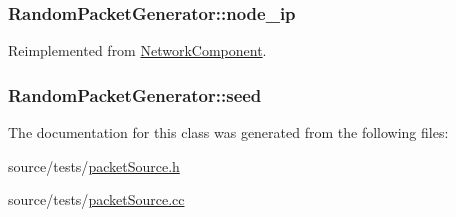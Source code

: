 \hypertarget{classRandomPacketGenerator_072334e770d2a5a5ee77c7a859fad16b}{
\subsubsection[{node\_\-ip}]{ {\bf RandomPacketGenerator::node\_\-ip}}}
\label{classRandomPacketGenerator_072334e770d2a5a5ee77c7a859fad16b}




Reimplemented from \hyperlink{classNetworkComponent_56599b3484333fb78af1b6c33f77cf16}{NetworkComponent}.\hypertarget{classRandomPacketGenerator_d4e9934b7709eea404fb5df509a07e21}{
\subsubsection[{seed}]{ {\bf RandomPacketGenerator::seed}}}
\label{classRandomPacketGenerator_d4e9934b7709eea404fb5df509a07e21}




The documentation for this class was generated from the following files:\begin{CompactItemize}
\item 
source/tests/\hyperlink{packetSource_8h}{packetSource.h}\item 
source/tests/\hyperlink{packetSource_8cc}{packetSource.cc}\end{CompactItemize}
